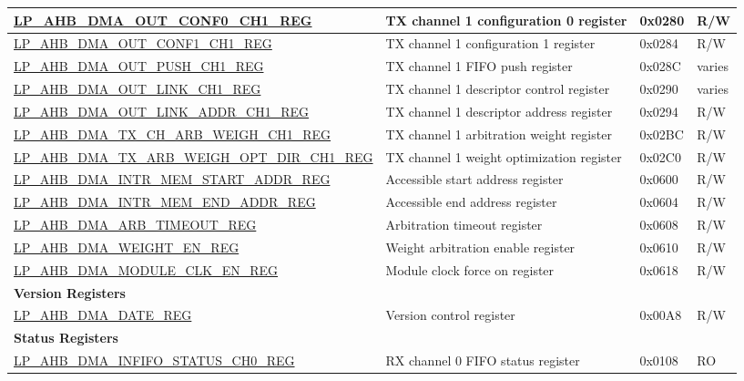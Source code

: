 \begin{longtable}{ | l | p{10cm} | p{1.3cm} | l | }
\hyperref[regdesc:LPAHBDMAOUTCONF0CHNREG]{LP\_AHB\_DMA\_OUT\_CONF0\_CH1\_REG} & TX channel 1 configuration 0 register & 0x0280 & R/W \\ \hline
\hyperref[regdesc:LPAHBDMAOUTCONF1CHNREG]{LP\_AHB\_DMA\_OUT\_CONF1\_CH1\_REG} & TX channel 1 configuration 1 register & 0x0284 & R/W \\ \hline
\hyperref[regdesc:LPAHBDMAOUTPUSHCHNREG]{LP\_AHB\_DMA\_OUT\_PUSH\_CH1\_REG} & TX channel 1 FIFO push register & 0x028C & varies \\ \hline
\hyperref[regdesc:LPAHBDMAOUTLINKCHNREG]{LP\_AHB\_DMA\_OUT\_LINK\_CH1\_REG} & TX channel 1 descriptor control register & 0x0290 & varies \\ \hline
\hyperref[regdesc:LPAHBDMAOUTLINKADDRCHNREG]{LP\_AHB\_DMA\_OUT\_LINK\_ADDR\_CH1\_REG} & TX channel 1 descriptor address register & 0x0294 & R/W \\ \hline
\hyperref[regdesc:LPAHBDMATXCHARBWEIGHCHNREG]{LP\_AHB\_DMA\_TX\_CH\_ARB\_WEIGH\_CH1\_REG} & TX channel 1 arbitration weight register & 0x02BC & R/W \\ \hline
\hyperref[regdesc:LPAHBDMATXARBWEIGHOPTDIRCHNREG]{LP\_AHB\_DMA\_TX\_ARB\_WEIGH\_OPT\_DIR\_CH1\_REG} & TX channel 1 weight optimization register & 0x02C0 & R/W \\ \hline
\hyperref[regdesc:LPAHBDMAINTRMEMSTARTADDRREG]{LP\_AHB\_DMA\_INTR\_MEM\_START\_ADDR\_REG} & Accessible start address register & 0x0600 & R/W \\ \hline
\hyperref[regdesc:LPAHBDMAINTRMEMENDADDRREG]{LP\_AHB\_DMA\_INTR\_MEM\_END\_ADDR\_REG} & Accessible end address register & 0x0604 & R/W \\ \hline
\hyperref[regdesc:LPAHBDMAARBTIMEOUTREG]{LP\_AHB\_DMA\_ARB\_TIMEOUT\_REG} & Arbitration timeout register & 0x0608 & R/W \\ \hline
\hyperref[regdesc:LPAHBDMAWEIGHTENREG]{LP\_AHB\_DMA\_WEIGHT\_EN\_REG} & Weight arbitration enable register & 0x0610 & R/W \\ \hline
\hyperref[regdesc:LPAHBDMAMODULECLKENREG]{LP\_AHB\_DMA\_MODULE\_CLK\_EN\_REG} & Module clock force on register & 0x0618 & R/W \\ \hline
\multicolumn{4}{|l|}{\textbf{Version Registers}} \\ \hline
\hyperref[regdesc:LPAHBDMADATEREG]{LP\_AHB\_DMA\_DATE\_REG} & Version control register & 0x00A8 & R/W \\ \hline
\multicolumn{4}{|l|}{\textbf{Status Registers}} \\ \hline
\hyperref[regdesc:LPAHBDMAINFIFOSTATUSCHNREG]{LP\_AHB\_DMA\_INFIFO\_STATUS\_CH0\_REG} & RX channel 0 FIFO status register & 0x0108 & RO \\ \hline

\end{longtable}
